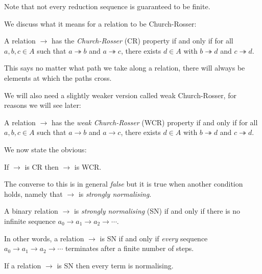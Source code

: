 \begin{remark}
    Note that not every reduction sequence is guaranteed to be finite.
\end{remark}

We discuss what it means for a relation to be Church-Rosser:

\begin{defin}
    A relation $\to$ has the \emph{Church-Rosser} (CR) property if and only if for all $a,b,c \in A$ such that $a \twoheadrightarrow b$ and $a \twoheadrightarrow c$, there exists $d \in A$ with $b \twoheadrightarrow d$ and $c \twoheadrightarrow d$.
\end{defin}

\begin{remark}
    This says no matter what path we take along a relation, there will always be elements at which the paths cross.
\end{remark}

We will also need a slightly weaker version called weak Church-Rosser, for reasons we will see later:

\begin{defin}
    A relation $\to$ has the \emph{weak Church-Rosser} (WCR) property if and only if for all $a, b, c \in A$ such that $a \to b$ and $a \to c$, there exists $d \in A$ with $b \twoheadrightarrow d$ and $c \twoheadrightarrow d$.
\end{defin}

We now state the obvious:

\begin{cor}\label{cr_is_wcr}
    If $\to$ is CR then $\to$ is WCR.
\end{cor}

The converse to this is in general \emph{false} but it is true when another condition holds, namely that $\to$ is \emph{strongly normalising}.

\begin{defin}
    A binary relation $\to$ is \emph{strongly normalising} (SN) if and only if there is no infinite sequence $a_0 \to a_1 \to a_2 \to  \cdots$.
\end{defin}

\begin{remark}
    In other words, a relation $\to$ is SN if and only if \emph{every} sequence $a_0 \to a_1 \to a_2 \to  \cdots$ terminates after a finite number of steps.
\end{remark}

\begin{cor}
    If a relation $\to$ is SN then every term is normalising.
\end{cor}

